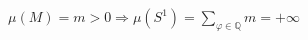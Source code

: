 \documentclass[preview]{standalone}
\begin{document}
\begin{align*}
\mu(M) = m > 0 \Rightarrow  \mu(S^1) = \sum_{\varphi \in \mathbb{Q}} m = +\infty
\end{align*}
\end{document}
